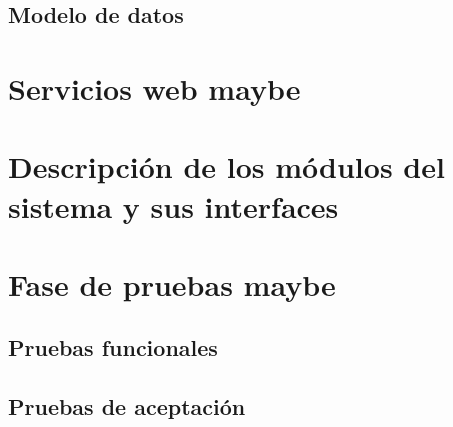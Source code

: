 \setlength{\parskip}{0mm}





\subsection{Modelo de datos}
\setlength{\parskip}{5mm}
\setlength{\parskip}{0mm}


\section{Servicios web maybe} 
\setlength{\parskip}{5mm}
\setlength{\parskip}{0mm}

\section{Descripción de los módulos del sistema y sus interfaces } 
\setlength{\parskip}{5mm}
\setlength{\parskip}{0mm}


\section{Fase de pruebas maybe } 
\setlength{\parskip}{5mm}
\setlength{\parskip}{0mm}

\subsection{Pruebas funcionales}
\setlength{\parskip}{5mm}
\setlength{\parskip}{0mm}

\subsection{Pruebas de aceptación}
\setlength{\parskip}{5mm}
\setlength{\parskip}{0mm}
